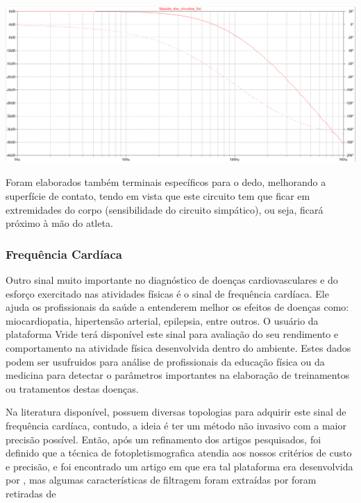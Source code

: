     \begin{center}
    	\includegraphics[scale=0.3]{figuras/Resultados_Simulacao_GSR}
        \label{gsr_sim}
    \end{center}
    
    Foram elaborados também terminais específicos para o dedo, melhorando a superfície de contato, tendo em vista que este circuito tem que ficar em extremidades do corpo (sensibilidade do circuito simpático), ou seja, ficará próximo à mão do atleta.
    

\subsubsection{Frequência Cardíaca}

Outro sinal muito importante no diagnóstico de doenças cardiovasculares e do esforço exercitado nas atividades físicas é o sinal de frequência cardíaca. Ele ajuda os profissionais da saúde a entenderem melhor os efeitos de doenças como: miocardiopatia, hipertensão arterial, epilepsia, entre outros. %
	O usuário da plataforma Vride terá disponível este sinal para avaliação do seu rendimento e comportamento na atividade física desenvolvida dentro do ambiente. Estes dados podem ser usufruidos para análise de profissionais da educação física ou da medicina para detectar o parâmetros importantes na elaboração de treinamentos ou tratamentos destas doenças. 
	
    Na literatura disponível, possuem diversas topologias para adquirir este sinal de frequência cardíaca, contudo, a ideia é ter um método não invasivo com a maior precisão possível. Então, após um refinamento dos artigos pesquisados, foi definido que a técnica de fotopletismografica atendia aos nossos critérios de custo e precisão, e foi encontrado um artigo em que era tal plataforma era desenvolvida por %
    , mas algumas características de filtragem foram extraídas por foram retiradas de %
	

